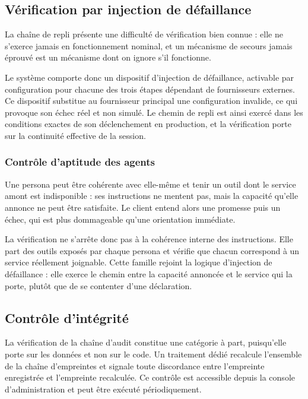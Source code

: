 \subsection{Vérification par injection de défaillance}

La chaîne de repli présente une difficulté de vérification bien connue : elle ne s'exerce jamais en fonctionnement nominal, et un mécanisme de secours jamais éprouvé est un mécanisme dont on ignore s'il fonctionne.

Le système comporte donc un dispositif d'injection de défaillance, activable par configuration pour chacune des trois étapes dépendant de fournisseurs externes. Ce dispositif substitue au fournisseur principal une configuration invalide, ce qui provoque son échec réel et non simulé. Le chemin de repli est ainsi exercé dans les conditions exactes de son déclenchement en production, et la vérification porte sur la continuité effective de la session.

\subsubsection{Contrôle d'aptitude des agents}

Une persona peut être cohérente avec elle-même et tenir un outil dont le service amont est indisponible : ses instructions ne mentent pas, mais la capacité qu'elle annonce ne peut être satisfaite. Le client entend alors une promesse puis un échec, qui est plus dommageable qu'une orientation immédiate.

La vérification ne s'arrête donc pas à la cohérence interne des instructions. Elle part des outils exposés par chaque persona et vérifie que chacun correspond à un service réellement joignable. Cette famille rejoint la logique d'injection de défaillance : elle exerce le chemin entre la capacité annoncée et le service qui la porte, plutôt que de se contenter d'une déclaration.

\subsection{Contrôle d'intégrité}

La vérification de la chaîne d'audit constitue une catégorie à part, puisqu'elle porte sur les données et non sur le code. Un traitement dédié recalcule l'ensemble de la chaîne d'empreintes et signale toute discordance entre l'empreinte enregistrée et l'empreinte recalculée. Ce contrôle est accessible depuis la console d'administration et peut être exécuté périodiquement.

